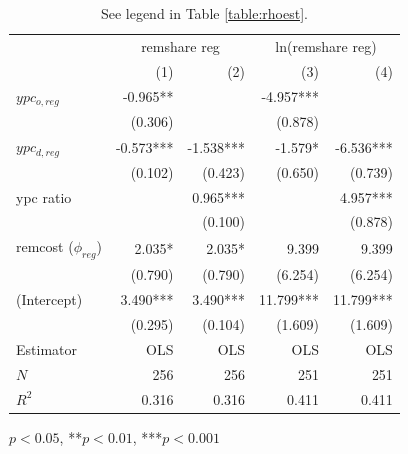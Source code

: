 \documentclass[letterpaper,11pt]{article}
\begin{document}
\begin{table}[H]
	\centering
	\begin{threeparttable}
		\begin{tabular}{lrrrr}
		\toprule
		              & \multicolumn{2}{c}{remshare reg} & \multicolumn{2}{c}{ln(remshare reg)} \\
		\cmidrule(lr){2-3} \cmidrule(lr){4-5}
		              &       (1) &                  (2) &       (3) &                      (4) \\
		\midrule
		$ypc_{o,reg}$  &  -0.965** &                      & -4.957*** &                          \\
		              &   (0.306) &                      &   (0.878) &                          \\
		$ypc_{d,reg}$  & -0.573*** &            -1.538*** &   -1.579* &                -6.536*** \\
		              &   (0.102) &              (0.423) &   (0.650) &                  (0.739) \\
		ypc ratio   &           &             0.965*** &           &                 4.957*** \\
		              &           &              (0.100) &           &                  (0.878) \\
		remcost ($\phi_{reg}$)   &    2.035* &               2.035* &     9.399 &                    9.399 \\
		              &   (0.790) &              (0.790) &   (6.254) &                  (6.254) \\
		(Intercept)   &  3.490*** &             3.490*** & 11.799*** &                11.799*** \\
		              &   (0.295) &              (0.104) &   (1.609) &                  (1.609) \\
		\midrule
		Estimator     &       OLS &                  OLS &       OLS &                      OLS \\
		\midrule
		$N$           &       256 &                  256 &       251 &                      251 \\
		$R^2$         &     0.316 &                0.316 &     0.411 &                    0.411 \\
		\bottomrule
		\end{tabular}
		\begin{tablenotes}
			\item *$p<0.05$, **$p<0.01$, ***$p<0.001$
		\end{tablenotes}
	\end{threeparttable}
	\caption{See legend in Table \ref{table:rhoest}.}
	\label{table:rhoestreg}
\end{table}
\end{document}
